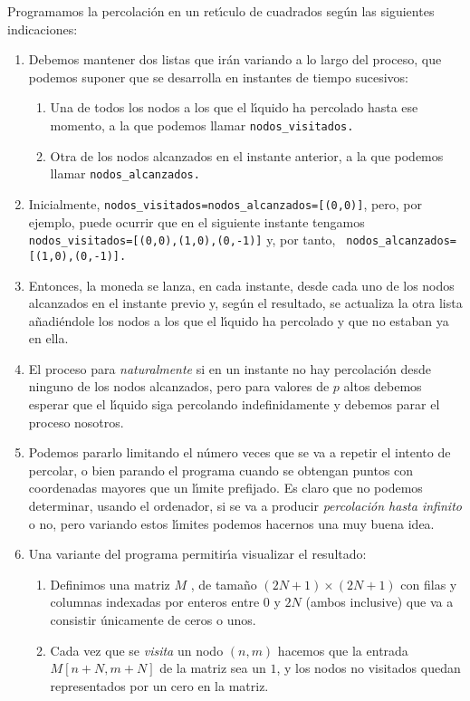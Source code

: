 \begin{ejer}
Programamos la percolaci\'on en un ret\'{\i}culo de cuadrados seg\'un las 
siguientes indicaciones:
\begin{enumerate}
\item Debemos mantener dos listas que ir\'an variando a lo largo del proceso, 
que podemos suponer que se desarrolla en instantes de tiempo sucesivos:
\begin{enumerate}
\item Una de todos los nodos a los que el l\'{\i}quido ha percolado hasta ese 
momento, a la que podemos llamar {\tt nodos\_visitados.}
\item Otra de los nodos alcanzados en el instante anterior, a la que podemos 
llamar {\tt nodos\_alcanzados.}
\end{enumerate}
\item Inicialmente, {\tt nodos\_visitados=nodos\_alcanzados=[(0,0)]}, pero, por 
ejemplo, puede ocurrir que en el siguiente instante tengamos {\tt 
nodos\_visitados=[(0,0),(1,0),(0,-1)]} y, por tanto, {\tt 
nodos\_alcanzados=[(1,0),(0,-1)].}
\item Entonces, la moneda se lanza, en cada instante, desde cada uno de los 
nodos alcanzados en el instante previo y, seg\'un el resultado, se actualiza la 
otra lista a\~nadi\'endole los nodos a los que el l\'{\i}quido ha percolado y 
que no estaban ya en ella.
\item  El proceso para {\itshape naturalmente} si en un instante no hay 
percolaci\'on desde ninguno de los nodos alcanzados, pero
para valores de $p$ altos debemos esperar que el l\'{\i}quido siga percolando 
indefinidamente y debemos parar el proceso nosotros.
\item  Podemos pararlo limitando el n\'umero veces que se va a repetir el 
intento de percolar, o bien parando el 
programa cuando se obtengan puntos con coordenadas mayores que un l\'{\i}mite 
prefijado. Es claro que no podemos determinar, usando el ordenador, si se va a 
producir {\itshape percolaci\'on hasta infinito} o no, pero variando estos 
l\'{\i}mites podemos hacernos una muy buena idea.
\item  Una variante del programa permitir\'{\i}a visualizar el resultado:
\begin{enumerate}
 \item Definimos una matriz $M$ , de tama\~no $(2N + 1)\times (2N + 1)$ con 
filas y columnas indexadas por enteros entre $0$ y
$2N$ (ambos inclusive) que va a consistir \'unicamente de ceros o unos.
 \item Cada vez que se {\itshape visita} un nodo $(n, m)$ hacemos que la 
entrada 
$M[n + N, m + N ]$  de la matriz sea un $1$, y los
nodos no visitados quedan representados por un cero en la matriz.


\end{enumerate}
\end{enumerate}
\end{ejer}
